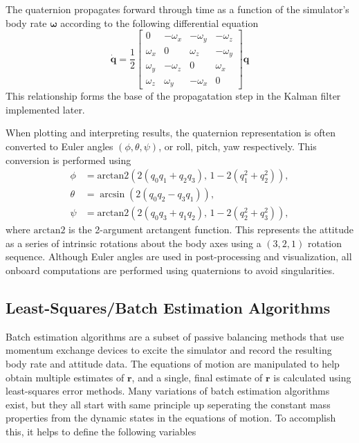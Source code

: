 The quaternion propagates forward through time as a function of the simulator's body rate $\bm{\omega}$ according to the following differential equation
\begin{equation}\label{equation:quat_kinematics}
    \dot{\bm{q}} = \frac{1}{2}
\begin{bmatrix}
0 & -\omega_x & -\omega_y & -\omega_z \\
\omega_x & 0 & \omega_z & -\omega_y \\
\omega_y & -\omega_z & 0 & \omega_x \\
\omega_z & \omega_y & -\omega_x & 0
\end{bmatrix}
\bm{q}
\end{equation}
This relationship forms the base of the propagatation step in the Kalman filter implemented later. 

When plotting and interpreting results, the quaternion representation is often converted to Euler angles $(\phi,\theta,\psi)$, or roll, pitch, yaw respectively. This conversion is performed using
\begin{equation}
\begin{aligned}
\phi &= \text{arctan2}\!\left(2(q_0 q_1 + q_2 q_3),\, 1 - 2(q_1^2 + q_2^2)\right), \\[4pt]
\theta &= \arcsin\!\left(2(q_0 q_2 - q_3 q_1)\right), \\[4pt]
\psi &= \text{arctan2}\!\left(2(q_0 q_3 + q_1 q_2),\, 1 - 2(q_2^2 + q_3^2)\right),
\end{aligned}
\end{equation}
where $\text{arctan2}$ is the 2-argument arctangent function. This represents the attitude as a series of intrinsic rotations about the body axes using a $(3,2,1)$ rotation sequence. Although Euler angles are used in post-processing and visualization, all onboard computations are performed using quaternions to avoid singularities.

\subsection{Least-Squares/Batch Estimation Algorithms}\label{sec:LSR}

Batch estimation algorithms are a subset of passive balancing methods that use momentum exchange devices to excite the simulator and record the resulting body rate and attitude data. The equations of motion are manipulated to help obtain multiple estimates of $\bm{r}$, and a single, final estimate of $\bm{r}$ is calculated using least-squares error methods. Many variations of batch estimation algorithms exist, but they all start with same principle up seperating the constant mass properties from the dynamic states in the equations of motion. To accomplish this, it helps to define the following variables

